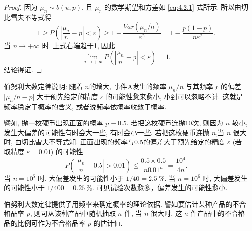 \begin{proof}
    因为 $ \mu_n \sim b ( n, p ) $, 且 $ \mu_n $ 的数学期望和方差如 \eqref{eq:4.2.1} 式所示.
    所以由切比雪夫不等式得
    \begin{equation}
        1 \geq P \left( \left\lvert \frac{\mu_n}{n} - p \right\rvert < \varepsilon \right) \geq 1 - \frac{Var (\mu_n / n)}{\varepsilon^2} = 1 - \frac{p ( 1 - p )}{n \varepsilon^2}.
    \end{equation}
    当 $ n \to + \infty $ 时, 上式右端趋于1, 因此
    \begin{equation*}
        \lim_{n \to +\infty} P \left( \left\lvert \frac{\mu_n}{n} - p \right\rvert < \varepsilon \right) = 1.
    \end{equation*}
    结论得证.
\end{proof}

伯努利大数定律说明: 随着 $ n $的增大, 事件A发生的频率 $ \mu_n / n $ 与其频率 $ p $ 的偏差 $ \lvert \mu_n / n - p \rvert $ 大于预先给定的精度 $ \varepsilon $ 的可能性愈来愈小, 小到可以忽略不计.
这就是频率稳定于概率的含义, 或者说频率依概率收敛于概率.

譬如, 抛一枚硬币出现正面的概率 $ p = 0.5 $.
若把这枚硬币连抛10次, 则因为 $ n $ 较小, 发生大偏差的可能性有时会大一些, 有时会小一些.
若把这枚硬币连抛 $ n $,当 $ n $ 很大时, 由切比雪夫不等式知: 正面出现的频率与0.5的偏差大于预先给定的精度 $ \varepsilon $ (若取精度 $ \varepsilon = 0.01 $) 的可能性
\begin{equation*}
    P \left( \left\lvert \frac{\mu_n}{n} - 0.5 \right\vert > 0.01 \right) \leq \frac{0.5 \times 0.5}{n 0.01^n} = \frac{10^4}{4n}.
\end{equation*}
当 $ n = 10^5 $ 时, 大偏差发生的可能性小于 $ 1/40 = \SI{2.5}{\percent} $.
当 $ n = 10^6 $ 时, 大偏差发生的可能性小于 $ 1/400 = \SI{0.25}{\percent} $.
可见试验次数愈多，偏差发生的可能性愈小.

伯努利大数定律提供了用频率来确定概率的理论依据.
譬如要估计某种产品的不合格品率 $ p $, 则可从该种产品中随机抽取 $ n $ 件, 当 $ n $ 很大时, 这 $ n $ 件产品中的不合格品的比例可作为不合格品率 $ p $ 的估计值.

